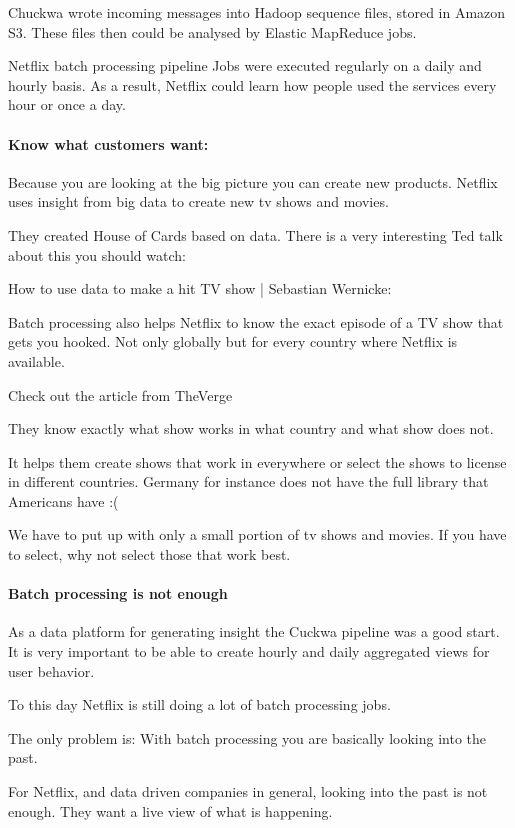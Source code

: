 \documentclass[12pt, numbers=noenddot]{scrreprt} %
\begin{document}
Chuckwa wrote incoming messages into Hadoop sequence files, stored in Amazon S3. These files then could be analysed by Elastic MapReduce jobs.

Netflix batch processing pipeline
Jobs were executed regularly on a daily and hourly basis. As a result, Netflix could learn how people used the services every hour or once a day.

\paragraph{Know what customers want:}

Because you are looking at the big picture you can create new products. Netflix uses insight from big data to create new tv shows and movies.

They created House of Cards based on data. There is a very interesting Ted talk about this you should watch:

How to use data to make a hit TV show | Sebastian Wernicke:


Batch processing also helps Netflix to know the exact episode of a TV show that gets you hooked. Not only globally but for every country where Netflix is available.

Check out the article from TheVerge

They know exactly what show works in what country and what show does not.

It helps them create shows that work in everywhere or select the shows to license in different countries. Germany for instance does not have the full library that Americans have :(

We have to put up with only a small portion of tv shows and movies. If you have to select, why not select those that work best.

\paragraph{Batch processing is not enough}

As a data platform for generating insight the Cuckwa pipeline was a good start. It is very important to be able to create hourly and daily aggregated views for user behavior.

To this day Netflix is still doing a lot of batch processing jobs.

The only problem is: With batch processing you are basically looking into the past.

For Netflix, and data driven companies in general, looking into the past is not enough. They want a live view of what is happening.
\end{document}
